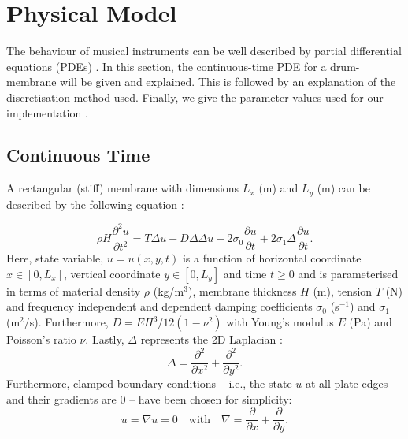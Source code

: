 \documentclass{article}
\begin{document}
\section{Physical Model}\label{sec:PM}
The behaviour of musical instruments can be well described by partial differential equations (PDEs) \cite{Fletcher1998}. In this section, the continuous-time PDE for a drum-membrane will be given and explained. This is followed by an explanation of the discretisation method used. Finally, we give the parameter values used for our implementation . 

\subsection{Continuous Time}
A rectangular (stiff) membrane with dimensions $L_x$ (m) and $L_y$ (m) can be described by the following equation \cite{bilbao2009numerical}:

\begin{equation}\label{eq:PDE}
\rho H\frac{\partial^2u}{\partial t^2} = T\Delta u - D\Delta\Delta u - 2 \sigma_0\frac{\partial u}{\partial t} + 2 \sigma_1 \Delta \frac{\partial u}{\partial t}.
\end{equation}
Here, state variable, $u = u(x,y,t)$ is a function of horizontal coordinate $x \in [0, L_x]$, vertical coordinate $y \in [0, L_y]$ and time $t\geq0$ and is parameterised in terms of material density $\rho$ (kg/m$^3$), membrane thickness $H$ (m), tension $T$ (N) and frequency independent and dependent damping coefficients $\sigma_0$ (s$^{-1}$) and $\sigma_1$ (m$^2$/s). Furthermore, $D = EH^3/12(1-\nu^2)$ with Young's modulus $E$ (Pa) and Poisson's ratio $\nu$. Lastly, $\Delta$ represents the 2D Laplacian \cite{bilbao2009numerical}:
\begin{equation}
    \Delta = \frac{\partial^2}{\partial x^2} + \frac{\partial^2}{\partial y^2}.
\end{equation}
Furthermore, clamped boundary conditions -- i.e., the state $u$ at all plate edges and their gradients are 0 -- have been chosen for simplicity:
\begin{equation}
    u = \nabla u = 0 \quad \text{with} \quad \nabla = \frac{\partial}{\partial x} + \frac{\partial}{\partial y}.
\end{equation}
\end{document}
